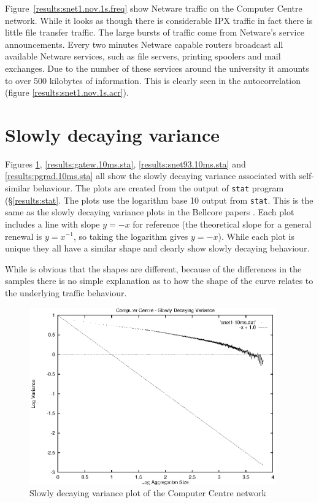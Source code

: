 Figure~\ref{results:snet1.nov.1s.freq} show Netware traffic on the
Computer Centre network.  While it looks as though there is
considerable IPX traffic in fact there is little file transfer
traffic.  The large bursts of traffic come from Netware's service
announcements.  Every two minutes Netware capable routers broadcast
all available Netware services, such as file servers, printing
spoolers and mail exchanges.  Due to the number of these services
around the university it amounts to over 500 kilobytes of information.
This is clearly seen in the autocorrelation (figure
\ref{results:snet1.nov.1s.acr}).

\clearpage

\section{Slowly decaying variance}

Figures \ref{results:snet1.10ms.sta}, \ref{results:gatew.10ms.sta},
\ref{results:snet93.10ms.sta} and \ref{results:pgrad.10ms.sta} all
show the slowly decaying variance associated with self-similar
behaviour.  The plots are created from the output of \texttt{stat}
program (\S \ref{results:stat}.  The plots use the logarithm base 10
output from \texttt{stat}.  This is the same as the slowly decaying
variance plots in the Bellcore papers \cite{Bell:1} \cite{Bell:2}.
Each plot includes a line with slope $y = -x$ for reference (the
theoretical slope for a general renewal is $y = x^{-1}$, so taking the
logarithm gives $y = -x$).  While each plot is unique they all have a
similar shape and clearly show slowly decaying behaviour.

While is obvious that the shapes are different, because of the
differences in the samples there is no simple explanation as to how the
shape of the curve relates to the underlying traffic behaviour.

\begin{figure}
\includegraphics[height=3in]{pics/snet1-10ms-sta.eps}
\caption{Slowly decaying variance plot of the Computer Centre network}
\label{results:snet1.10ms.sta}
\end{figure}

